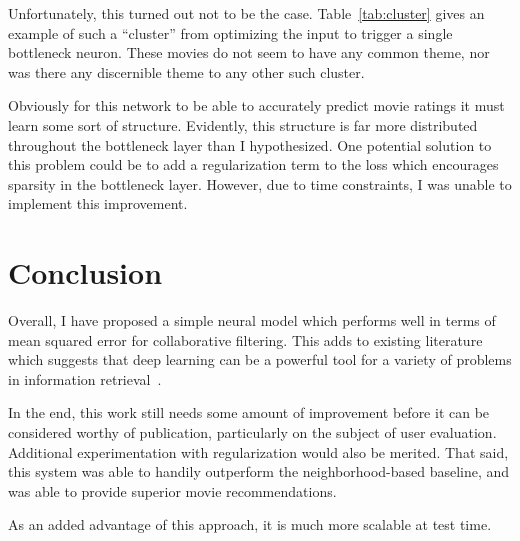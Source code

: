 \documentclass[12pt]{article}
\begin{document}
Unfortunately, this turned out not to be the case.
Table~\ref{tab:cluster} gives an example of such a ``cluster'' from optimizing
the input to trigger a single bottleneck neuron.
These movies do not seem to have any common theme, nor was there any
discernible theme to any other such cluster.

Obviously for this network to be able to accurately predict movie ratings it
must learn some sort of structure.
Evidently, this structure is far more distributed throughout the bottleneck
layer than I hypothesized.
One potential solution to this problem could be to add a regularization term
to the loss which encourages sparsity in the bottleneck layer.
However, due to time constraints, I was unable to implement this improvement.

\section{Conclusion}

Overall, I have proposed a simple neural model which performs well in terms of
mean squared error for collaborative filtering.
This adds to existing literature which suggests that deep learning can be a
powerful tool for a variety of problems in information
retrieval~\cite{dl-recsys-survey}.

In the end, this work still needs some amount of improvement before it can be
considered worthy of publication, particularly on the subject of user
evaluation.
Additional experimentation with regularization would also be merited.
That said, this system was able to handily outperform the neighborhood-based
baseline, and was able to provide superior movie recommendations.

As an added advantage of this approach, it is much more scalable at test time.



\end{document}
